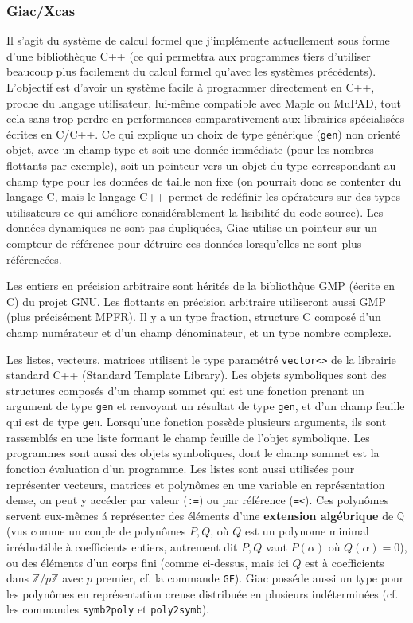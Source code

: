 \documentclass[a4paper,11pt]{article}
\newcommand{\Z}{{\mathbb{Z}}}
\newcommand{\Q}{{\mathbb{Q}}}
\begin{document}
\begin{giacjshere}
\subsubsection{Giac/Xcas}
Il s'agit du système de calcul formel que j'implémente actuellement sous 
forme d'une biblioth\`eque C++ (ce qui
permettra aux programmes tiers d'utiliser beaucoup plus facilement du 
calcul formel qu'avec les syst\`emes pr\'ec\'edents). L'objectif est 
d'avoir un syst\`eme facile \`a programmer directement en C++, proche 
du langage utilisateur, lui-m\^eme compatible avec Maple ou MuPAD, 
tout cela sans trop perdre en performances comparativement aux
librairies sp\'ecialis\'ees \'ecrites en C/C++. Ce qui explique un choix 
de type g\'en\'erique (\verb=gen=) non orient\'e objet, avec un champ type 
et soit une donn\'ee imm\'ediate (pour les nombres flottants par exemple), 
soit un pointeur vers un objet du type correspondant au champ type pour 
les donn\'ees de taille non fixe (on pourrait donc se
contenter du langage C, mais le langage C++ permet de red\'efinir 
les op\'erateurs sur des types utilisateurs ce qui
am\'eliore consid\'erablement la lisibilit\'e du code source). 
Les donn\'ees dynamiques ne sont pas dupliqu\'ees, Giac
utilise un pointeur sur un compteur de r\'ef\'erence pour d\'etruire 
ces donn\'ees lorsqu'elles ne sont plus r\'ef\'erenc\'ees.

Les entiers en pr\'ecision arbitraire sont h\'erit\'es de la biblioth\`que
GMP (\'ecrite en C) du projet GNU. Les flottants en pr\'ecision arbitraire
utiliseront aussi GMP (plus précisément MPFR).
Il y a un type fraction, structure C compos\'e d'un champ num\'erateur
et d'un champ d\'enominateur, et un type nombre complexe.

Les listes, vecteurs, matrices utilisent le type paramétré \verb|vector<>|
de la librairie standard C++ (Standard Template Library).
Les objets symboliques sont des structures compos\'es d'un champ sommet
qui est une fonction prenant un argument de type \verb|gen|
et renvoyant un r\'esultat
de type \verb|gen|, et d'un champ feuille qui est de type \verb|gen|.
Lorsqu'une fonction poss\`ede plusieurs arguments, ils sont rassembl\'es
en une liste formant le champ feuille de l'objet symbolique.
Les programmes sont aussi des objets symboliques, dont le champ
sommet est la fonction évaluation d'un programme.
Les listes sont aussi utilis\'ees pour repr\'esenter vecteurs, matrices
et polyn\^omes en une variable en repr\'esentation dense, on peut
y acc\'eder par valeur (\verb|:=|) ou par r\'ef\'erence
(\verb|=<|). Ces polyn\^omes servent eux-m\^emes \'a repr\'esenter
des \'el\'ements d'une 
{\bf extension alg\'ebrique}  de $\Q$ (vus comme
un couple de polyn\^omes $P,Q$, o\`u $Q$ est un polynome minimal
irr\'eductible \`a coefficients entiers, autrement dit $P,Q$ vaut $P(\alpha)$ 
o\`u $Q(\alpha)=0$),
ou des \'el\'ements d'un corps fini (comme ci-dessus, mais ici $Q$ est
\`a coefficients dans $\Z/p\Z$ avec $p$ premier, cf. la commande \verb|GF|).
Giac poss\'ede aussi un type pour les polyn\^omes
en repr\'esentation creuse distribu\'ee en plusieurs
ind\'etermin\'ees (cf. les commandes \verb|symb2poly| et \verb|poly2symb|).


\end{giacjshere}
\end{document}
